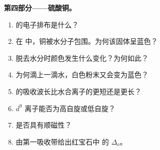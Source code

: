 \begin{problem}
\medskip
\noindent\textbf{第四部分——硫酸铜。}
\begin{enumerate}[resume]
  \item {} 的电子排布是什么？
  \item 在  中，铜被水分子包围。为何该固体呈蓝色？
  \item 脱去水分时颜色发生什么变化？为何如此？
  \item 为何滴上一滴水，白色粉末又会变为蓝色？
  \item {} 的吸收波长比水合离子的更短还是更长？
  \item $d^9$ 离子能否为高自旋或低自旋？
  \item {} 是否具有顺磁性？
  \item 由第一吸收带给出红宝石中  的 $\Delta_o$。
\end{enumerate}
\end{problem}
